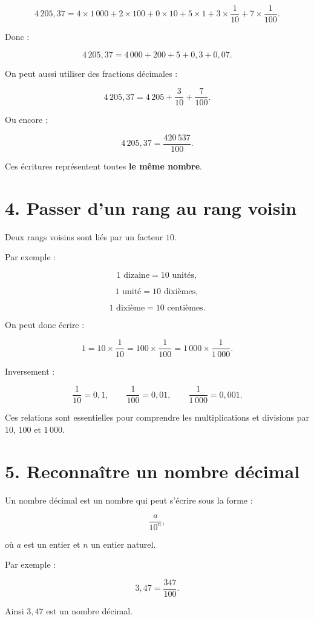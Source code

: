 \[
4\,205{,}37
=
4\times1\,000
+
2\times100
+
0\times10
+
5\times1
+
3\times\dfrac{1}{10}
+
7\times\dfrac{1}{100}.
\]

Donc :

\[
4\,205{,}37
=
4\,000
+
200
+
5
+
0{,}3
+
0{,}07.
\]

On peut aussi utiliser des fractions décimales :

\[
4\,205{,}37
=
4\,205+\dfrac{3}{10}+\dfrac{7}{100}.
\]

Ou encore :

\[
4\,205{,}37
=
\dfrac{420\,537}{100}.
\]

Ces écritures représentent toutes \textbf{le même nombre}.

\section{4. Passer d’un rang au rang voisin}

Deux rangs voisins sont liés par un facteur $10$.

Par exemple :

\[
1\text{ dizaine}=10\text{ unités},
\]

\[
1\text{ unité}=10\text{ dixièmes},
\]

\[
1\text{ dixième}=10\text{ centièmes}.
\]

On peut donc écrire :

\[
1=10\times\dfrac{1}{10}
=100\times\dfrac{1}{100}
=1\,000\times\dfrac{1}{1\,000}.
\]

Inversement :

\[
\dfrac{1}{10}=0{,}1,
\qquad
\dfrac{1}{100}=0{,}01,
\qquad
\dfrac{1}{1\,000}=0{,}001.
\]

Ces relations sont essentielles pour comprendre les multiplications et divisions par $10$, $100$ et $1\,000$.

\section{5. Reconnaître un nombre décimal}

Un nombre décimal est un nombre qui peut s’écrire sous la forme :

\[
\dfrac{a}{10^n},
\]

où $a$ est un entier et $n$ un entier naturel.

Par exemple :

\[
3{,}47=\dfrac{347}{100}.
\]

Ainsi $3{,}47$ est un nombre décimal.

